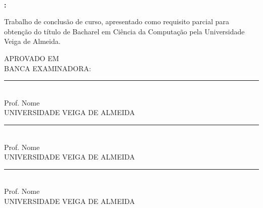 
\begin{center}

    \thispagestyle{pretext}
    
    \ \\ 
    \printAuthors

    \vfill

    \textbf{\uppercase\expandafter{\TitleName}:} \\
    \textbf{\uppercase\expandafter{\SubtitleName}}

    \vfill


    \begin{adjustwidth}{7.5cm}{}
        \noindent Trabalho de conclusão de curso, apresentado como requisito parcial para obtenção do título de Bacharel em Ciência da Computação pela Universidade Veiga de Almeida.
    \end{adjustwidth}

    \vfill

    {

        APROVADO EM\\[2cm]

        BANCA EXAMINADORA: \\[1.5cm]

        \rule{0.7\textwidth}{0.4pt} \\
        Prof. Nome \\ 
        UNIVERSIDADE VEIGA DE ALMEIDA \\[1.5cm]

        \rule{0.7\textwidth}{0.4pt} \\
        Prof. Nome \\ 
        UNIVERSIDADE VEIGA DE ALMEIDA \\[1.5cm]

        \rule{0.7\textwidth}{0.4pt} \\
        Prof. Nome \\ 
        UNIVERSIDADE VEIGA DE ALMEIDA \\
    }


\end{center}


\newpage
